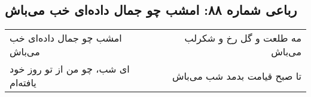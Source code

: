 \begin{center}
\section*{رباعی شماره ۸۸: امشب چو جمال داده‌ای خب می‌باش}
\label{sec:088}
\begin{longtable}{l p{0.5cm} r}
امشب چو جمال داده‌ای خب می‌باش
&&
مه طلعت و گل رخ و شکرلب می‌باش
\\
ای شب، چو من از تو روز خود یافته‌ام
&&
تا صبح قیامت بدمد شب می‌باش
\\
\end{longtable}
\end{center}
